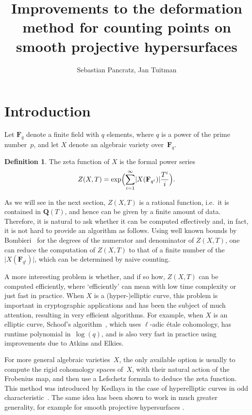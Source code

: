 \documentclass[a4paper,11pt]{article}
\author{Sebastian Pancratz, Jan Tuitman}
\title{Improvements to the deformation method for counting points 
on smooth projective hypersurfaces}
\numberwithin{equation}{section}
\providecommand{\card}[1]{\lvert#1\rvert}                %
\newcommand{\QQ}{\mathbf{Q}} %
\newcommand{\FF}{\mathbf{F}} %
\theoremstyle{definition}
\newtheorem{defn}[thm]{Definition}
\begin{document}
\maketitle

\setcounter{tocdepth}{2}
\tableofcontents


\section{Introduction}
\label{sec:Introduction}

Let $\FF_q$ denote a finite field with $q$ elements, where $q$ is a power of 
the prime number~$p$, and let $X$ denote an algebraic variety over~$\FF_q$. 

\begin{defn}
The zeta function of $X$ is the formal power series
\[
Z(X,T) = \exp \Bigl(\sum_{i=1}^{\infty} \card{X(\FF_{q^i})} \frac{T^i}{i} \Bigr).
\]
\end{defn}

As we will see in the next section, $Z(X,T)$ 
is a rational function, i.e.\ it is contained in $\QQ(T)$, and 
hence can be given by a finite amount of data. Therefore, it is natural 
to ask whether it can be computed effectively and, in fact, it is not 
hard to provide an algorithm as follows. Using well known bounds 
by Bombieri~\citep{Bombieri1966} for the degrees of the numerator and 
denominator of $Z(X,T)$, one can reduce the computation of $Z(X,T)$ to that 
of a finite number of the $\card{X(\FF_{q^i})}$, which can be determined 
by naive counting.

A more interesting problem is whether, and if so how, $Z(X,T)$ can be 
computed efficiently, where `efficiently' can mean with low time complexity 
or just fast in practice. When $X$ is a (hyper-)elliptic curve, this problem
is important in cryptographic applications and has been the subject of 
much attention, resulting in very efficient algorithms.  For example, when 
$X$ is an elliptic curve, Schoof's algorithm~\citep{Schoof1995}, which uses 
$\ell$-adic \'etale cohomology, has runtime polynomial in~$\log(q)$, and is 
also very fast in practice using improvements due to Atkins and Elkies.

For more general algebraic varieties~$X$, the only available option is 
usually to compute the rigid cohomology spaces of~$X$, with their natural 
action of the Frobenius map, and then use a Lefschetz formula to deduce the 
zeta function. This method was introduced by Kedlaya in the case of 
hyperelliptic curves in odd characteristic~\citep{Kedlaya2001}.  The same 
idea has been shown to work in much greater generality, for example for 
smooth projective hypersurfaces \citep{AbbottKedlayaRoe2006}. 
\end{document}
